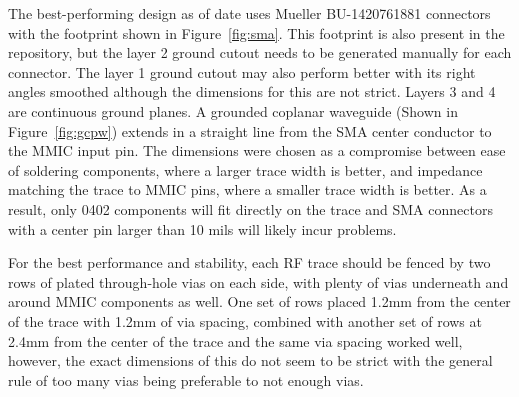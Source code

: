 \documentclass[titlepage]{article}
\begin{document}
The best-performing design as of date uses Mueller BU-1420761881 connectors with the footprint shown in Figure~\ref{fig:sma}. This footprint is also present in the repository, but the layer 2 ground cutout needs to be generated manually for each connector. The layer 1 ground cutout may also perform better with its right angles smoothed although the dimensions for this are not strict. Layers 3 and 4 are continuous ground planes. A grounded coplanar waveguide (Shown in Figure~\ref{fig:gcpw}) extends in a straight line from the SMA center conductor to the MMIC input pin. The dimensions were chosen as a compromise between ease of soldering components, where a larger trace width is better, and impedance matching the trace to MMIC pins, where a smaller trace width is better. As a result, only 0402 components will fit directly on the trace and SMA connectors with a center pin larger than 10 mils will likely incur problems.

For the best performance and stability, each RF trace should be fenced by two rows of plated through-hole vias on each side, with plenty of vias underneath and around MMIC components as well. One set of rows placed 1.2mm from the center of the trace with 1.2mm of via spacing, combined with another set of rows at 2.4mm from the center of the trace and the same via spacing worked well, however, the exact dimensions of this do not seem to be strict with the general rule of too many vias being preferable to not enough vias.
\end{document}
